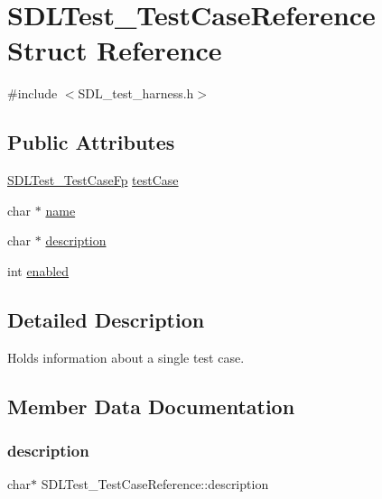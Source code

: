 \hypertarget{struct_s_d_l_test___test_case_reference}{}\section{S\+D\+L\+Test\+\_\+\+Test\+Case\+Reference Struct Reference}
\label{struct_s_d_l_test___test_case_reference}


{\ttfamily \#include $<$S\+D\+L\+\_\+test\+\_\+harness.\+h$>$}

\subsection*{Public Attributes}
\begin{DoxyCompactItemize}
\item 
\mbox{\hyperlink{_s_d_l__test__harness_8h_ae1a62d8f725d57dc95faddcc5409afbb}{S\+D\+L\+Test\+\_\+\+Test\+Case\+Fp}} \mbox{\hyperlink{struct_s_d_l_test___test_case_reference_af9472f0c421a2845b540fc28fb30a3ef}{test\+Case}}
\item 
char $\ast$ \mbox{\hyperlink{struct_s_d_l_test___test_case_reference_aabd588c915c52fb13bcd0c71e071a604}{name}}
\item 
char $\ast$ \mbox{\hyperlink{struct_s_d_l_test___test_case_reference_a1ee6c8a2529fdfcd62bb1483c26be67d}{description}}
\item 
int \mbox{\hyperlink{struct_s_d_l_test___test_case_reference_a15168c85e38cae7557b4beb477ef6f9a}{enabled}}
\end{DoxyCompactItemize}


\subsection{Detailed Description}
Holds information about a single test case. 

\subsection{Member Data Documentation}
\mbox{\label{struct_s_d_l_test___test_case_reference_a1ee6c8a2529fdfcd62bb1483c26be67d}} 
\subsubsection{\texorpdfstring{description}{description}}
{\footnotesize\ttfamily char$\ast$ S\+D\+L\+Test\+\_\+\+Test\+Case\+Reference\+::description}

